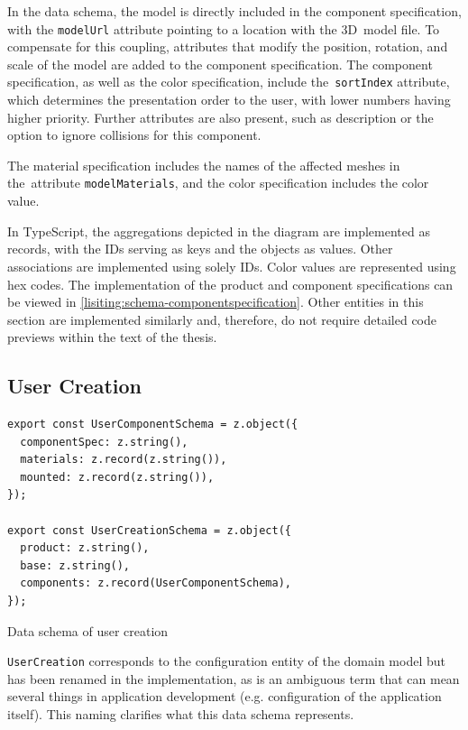 In the data schema, the model is directly included in the component specification, with the \texttt{modelUrl} attribute pointing to a location with the 3D~model file. To compensate for this coupling, attributes that modify the position, rotation, and scale of the model are added to the component specification. The component specification, as well as the color specification, include the~\texttt{sortIndex} attribute, which determines the presentation order to the user, with lower numbers having higher priority. Further attributes are also present, such as description or the option to ignore collisions for this component.

The material specification includes the names of the affected meshes in the~attribute \texttt{modelMaterials}, and the color specification includes the color value.

In TypeScript, the aggregations depicted in the  diagram are implemented as records, with the IDs serving as keys and the objects as values. Other associations are implemented using solely IDs. Color values are represented using hex codes. The implementation of the product and component specifications can be viewed in \autoref{lisiting:schema-componentspecification}. Other entities in this section are implemented similarly and, therefore, do not require detailed code previews within the text of the thesis.


\subsection{User Creation}

\begin{listing}[h]
\begin{verbatim}
export const UserComponentSchema = z.object({
  componentSpec: z.string(),
  materials: z.record(z.string()),
  mounted: z.record(z.string()),
});

export const UserCreationSchema = z.object({
  product: z.string(),
  base: z.string(),
  components: z.record(UserComponentSchema),
});
\end{verbatim}
\caption{Data schema of user creation}
\label{lisiting:schema-usercreation}
\end{listing}

\texttt{UserCreation} corresponds to the configuration entity of the domain model but has been renamed in the implementation, as  is an ambiguous term that can mean several things in application development (e.g. configuration of the application itself). This naming clarifies what this data schema represents.

